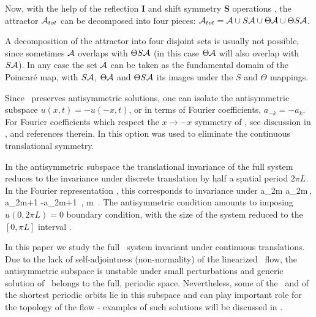 Now, with the help of the 
reflection $\mathbf{I}$ and shift symmetry $ \mathbf{S}$
operations
,
the  attractor ${\cal A}_{tot}$ can be
decomposed into four pieces:
 ${\cal A}_{tot}={\cal A} \cup S {\cal A}  \cup \Theta {\cal A}
  \cup \Theta S {\cal A} $. 

A decomposition
of the attractor into four disjoint sets
is usually not possible, since sometimes $ {\cal A}$ overlaps with
$\Theta S{\cal A} $ (in this case $\Theta  {\cal A}$ will also  overlap with
$S {\cal A} $).
In any case  the set $ {\cal A}$ can be taken as
the fundamental
domain of the Poincar{\'e} map, with $S  {\cal A} $,
$\Theta  {\cal A} $ and $\Theta S  {\cal A} $ its images under the
$S$ and $\Theta$ mappings.



Since \KSe\ preserves
antisymmetric solutions, one can isolate the antisymmetric
subspace 
$u(x,t)=-u(-x,t)$, or in terms of Fourier coefficients,
$a_{-k}= - a_k$. 
For Fourier coefficients which respect the $x \to -x$ symmetry of
\KSe, see discussion in ,
and references therein.
In  
this option was used to eliminate
the continuous translational symmetry.

In the antisymmetric subspace the translational 
invariance of the full system reduces
to the invariance under discrete
translation by half a spatial period $2\pi L$.
In the Fourier representation , 
this corresponds to invariance under 
\beq
a_{2m} \to a_{2m}\,, a_{2m+1} \to -a_{2m+1}
\,, m \in {}
\,.
The antisymmetric condition amounts to imposing
$u(0,2\pi L)=0$ boundary condition, with
the size of the system reduced to
the $[0, \pi L]$ interval 
.

In this paper we study the full \KS\ system invariant
under continuous translations. Due to the lack of self-adjointness
(non-normality) of the linearized \KS\ flow, 
the antisymmetric subspace
is unstable under small perturbations and generic solution of 
\KSe\ belongs to the full, periodic space. Nevertheless, some of
the \eqva\ and of the shortest periodic orbits lie in this subspace
and can play important role for the topology of the flow - examples
of such solutions will be discussed in .


